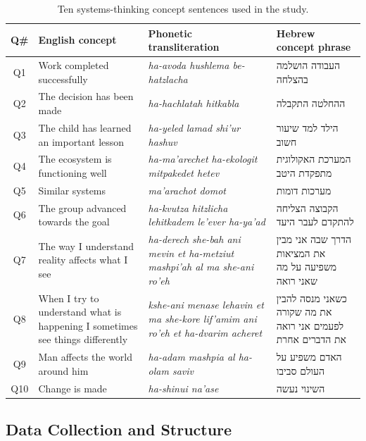 \documentclass[12pt,a4paper]{article}
\begin{document}
\begin{table}[H]
\centering
\caption{Ten systems-thinking concept sentences used in the study.}
\label{tab:concepts}
\small
\begin{tabular}{clp{4cm}p{4.8cm}}
\toprule
\textbf{Q\#} & \textbf{English concept} & \textbf{Phonetic transliteration} & \textbf{Hebrew concept phrase} \\
\midrule
Q1  & Work completed successfully
    & \textit{ha-avoda hushlema be-hatzlacha}
    & \texthebrew{העבודה הושלמה בהצלחה} \\[3pt]
Q2  & The decision has been made
    & \textit{ha-hachlatah hitkabla}
    & \texthebrew{ההחלטה התקבלה} \\[3pt]
Q3  & The child has learned an important lesson
    & \textit{ha-yeled lamad shi'ur hashuv}
    & \texthebrew{הילד למד שיעור חשוב} \\[3pt]
Q4  & The ecosystem is functioning well
    & \textit{ha-ma'arechet ha-ekologit mitpakedet hetev}
    & \texthebrew{המערכת האקולוגית מתפקדת היטב} \\[3pt]
Q5  & Similar systems
    & \textit{ma'arachot domot}
    & \texthebrew{מערכות דומות} \\[3pt]
Q6  & The group advanced towards the goal
    & \textit{ha-kvutza hitzlicha lehitkadem le'ever ha-ya'ad}
    & \texthebrew{הקבוצה הצליחה להתקדם לעבר היעד} \\[3pt]
Q7  & The way I understand reality affects what I see
    & \textit{ha-derech she-bah ani mevin et ha-metziut mashpi'ah al ma she-ani ro'eh}
    & \texthebrew{הדרך שבה אני מבין את המציאות משפיעה על מה שאני רואה} \\[3pt]
Q8  & When I try to understand what is happening I sometimes see things differently
    & \textit{kshe-ani menase lehavin et ma she-kore lif'amim ani ro'eh et ha-dvarim acheret}
    & \texthebrew{כשאני מנסה להבין את מה שקורה לפעמים אני רואה את הדברים אחרת} \\[3pt]
Q9  & Man affects the world around him
    & \textit{ha-adam mashpia al ha-olam saviv}
    & \texthebrew{האדם משפיע על העולם סביבו} \\[3pt]
Q10 & Change is made
    & \textit{ha-shinui na'ase}
    & \texthebrew{השינוי נעשה} \\
\bottomrule
\end{tabular}
\end{table}

\subsection{Data Collection and Structure}
\end{document}
